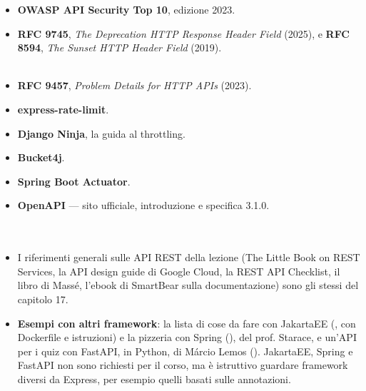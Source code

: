 \begin{itemize}
  \item \textbf{OWASP API Security Top 10}, edizione 2023. \\
  \item \textbf{RFC 9745}, \textit{The Deprecation HTTP Response Header Field}
        (2025), e \textbf{RFC 8594}, \textit{The Sunset HTTP Header Field}
        (2019). \\
         \\
  \item \textbf{RFC 9457}, \textit{Problem Details for HTTP APIs} (2023). \\
  \item \textbf{express-rate-limit}. \\
  \item \textbf{Django Ninja}, la guida al throttling. \\
  \item \textbf{Bucket4j}. \\ 
  \item \textbf{Spring Boot Actuator}. \\
  \item \textbf{OpenAPI} --- sito ufficiale, introduzione e specifica 3.1.0. \\
         \\
         \\
  \item I riferimenti generali sulle API REST della lezione (The Little Book on
        REST Services, la API design guide di Google Cloud, la REST API
        Checklist, il libro di Massé, l'ebook di SmartBear sulla
        documentazione) sono gli stessi del capitolo 17.
  \item \textbf{Esempi con altri framework}: la lista di cose da fare con
        JakartaEE (,
        con Dockerfile e istruzioni) e la pizzeria con Spring
        (), del prof.
        Starace, e un'API per i quiz con FastAPI, in Python, di Márcio Lemos
        (). JakartaEE, Spring e
        FastAPI non sono richiesti per il corso, ma è istruttivo guardare
        framework diversi da Express, per esempio quelli basati sulle
        annotazioni.
\end{itemize}
